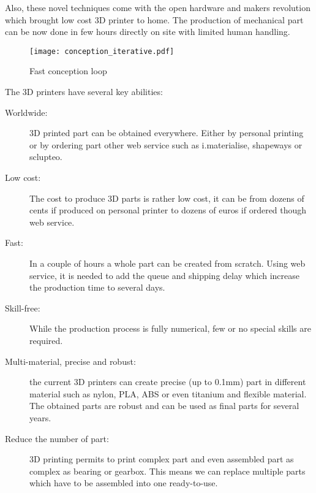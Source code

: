 \begin{figure}[!h]
\centering
    \hfil
    \caption{}
    \label{fig:complex_3D_printed_part}
\end{figure}


Also, these novel techniques come with the open hardware and makers revolution which brought low cost 3D printer to home. The production of mechanical part can be now done in few hours directly on site with limited human handling.

\begin{figure}[!h]
    \begin{center}
        \texttt{[image: conception\_iterative.pdf]}
    \end{center}
    \caption{Fast conception loop}
    \label{fig:conception_loop}
\end{figure}

The 3D printers have several key abilities:
\begin{description}
    \item[Worldwide:] 3D printed part can be obtained everywhere. Either by personal printing or by ordering part other web service such as i.materialise, shapeways or sclupteo.
    \item[Low cost:] The cost to produce 3D parts is rather low cost, it can be from dozens of cents if produced on personal printer to dozens of euros if ordered though web service.
    \item[Fast:] In a couple of hours a whole part can be created from scratch. Using web service, it is needed to add the queue and shipping delay which increase the production time to several days.
    \item[Skill-free:] While the production process is fully numerical, few or no special skills are required.
    \item[Multi-material, precise and robust:] the current 3D printers can create precise (up to 0.1mm) part in different material such as nylon, PLA, ABS or even titanium and flexible material. The obtained parts are robust and can be used as final parts for several years.
    \item[Reduce the number of part:] 3D printing permits to print complex part and even assembled part as complex as bearing or gearbox. This means we can replace multiple parts which have to be assembled into one ready-to-use.
\end{description}

